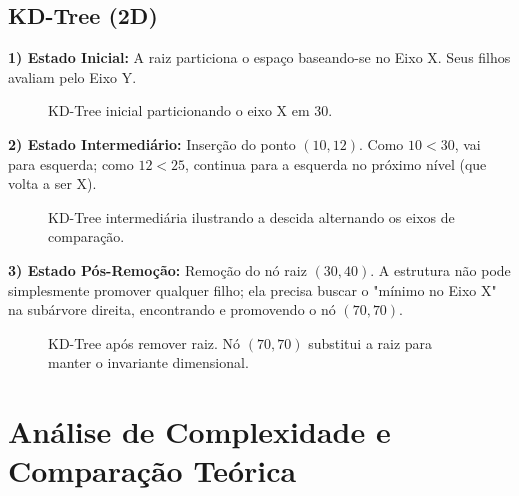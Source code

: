 \documentclass[conference]{IEEEtran}
\begin{document}
\subsection{KD-Tree (2D)}

\textbf{1) Estado Inicial:} A raiz particiona o espaço baseando-se no Eixo X. Seus filhos avaliam pelo Eixo Y.
\begin{figure}[htbp]
\centering
{}
\caption{KD-Tree inicial particionando o eixo X em 30.}
\label{fig:kd1}
\end{figure}

\textbf{2) Estado Intermediário:} Inserção do ponto $(10, 12)$. Como $10 < 30$, vai para esquerda; como $12 < 25$, continua para a esquerda no próximo nível (que volta a ser X).
\begin{figure}[htbp]
\centering
{}
\caption{KD-Tree intermediária ilustrando a descida alternando os eixos de comparação.}
\label{fig:kd2}
\end{figure}

\textbf{3) Estado Pós-Remoção:} Remoção do nó raiz $(30, 40)$. A estrutura não pode simplesmente promover qualquer filho; ela precisa buscar o "mínimo no Eixo X" na subárvore direita, encontrando e promovendo o nó $(70, 70)$.
\begin{figure}[htbp]
\centering
{}
\caption{KD-Tree após remover raiz. Nó $(70, 70)$ substitui a raiz para manter o invariante dimensional.}
\label{fig:kd3}
\end{figure}

\section{Análise de Complexidade e Comparação Teórica}
\end{document}
